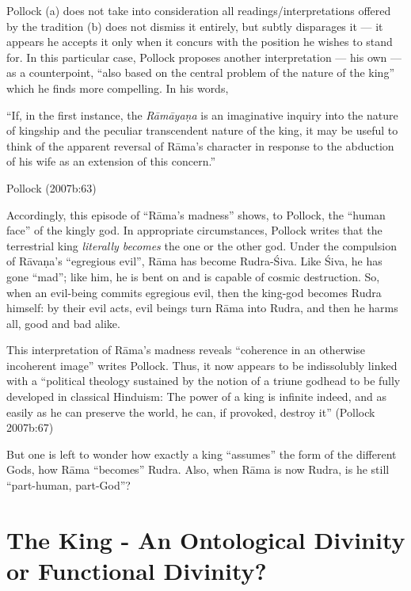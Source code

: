 Pollock (a) does not take into consideration all readings/interpretations offered by the tradition (b) does not dismiss it entirely, but subtly disparages it --- it appears he accepts it only when it concurs with the position he wishes to stand for. In this particular case, Pollock proposes another interpretation --- his own --- as a counterpoint, “also based on the central problem of the nature of the king” which he finds more compelling. In his words, 

\begin{myquote}
“If, in the first instance, the {\sl Rāmāyaṇa} is an imaginative inquiry into the nature of kingship and the peculiar transcendent nature of the king, it may be useful to think of the apparent reversal of Rāma’s character in response to the abduction of his wife as an extension of this concern.”

\hfill Pollock (2007b:63)
\end{myquote}

Accordingly, this episode of “Rāma’s madness” shows, to Pollock, the “human face” of the kingly god.  In appropriate circumstances, Pollock writes that the terrestrial king {\sl literally becomes} the one or the other god. Under the compulsion of Rāvaṇa’s “egregious evil”, Rāma has become Rudra-Śiva. Like Śiva, he has gone “mad”; like him, he is bent on and is capable of cosmic destruction. So, when an evil-being commits egregious evil, then the king-god becomes Rudra himself: by their evil acts, evil beings turn Rāma into Rudra, and then he harms all, good and bad alike. 

This interpretation of Rāma’s madness reveals “coherence in an otherwise incoherent image” writes Pollock. Thus, it now appears to be indissolubly linked with a “political theology sustained by the notion of a triune godhead to be fully developed in classical Hinduism: The power of a king is infinite indeed, and as easily as he can preserve the world, he can, if provoked, destroy it” (Pollock 2007b:67) 

But one is left to wonder how exactly a king “assumes” the form of the different Gods, how Rāma “becomes” Rudra. Also, when Rāma is now Rudra, is he still “part-human, part-God”? \\[-25pt]

\section{The King - An Ontological Divinity or Functional Divinity?}\label{sec2.5}

